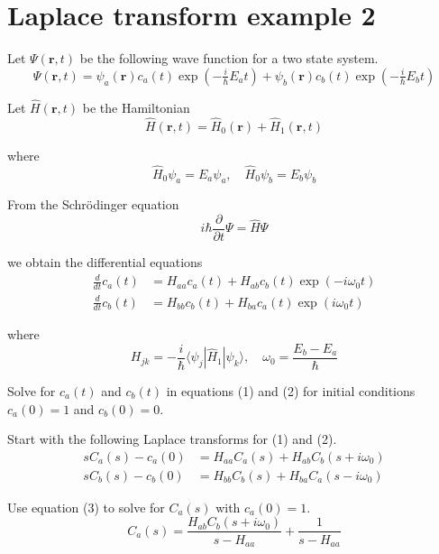 

\section*{Laplace transform example 2}

Let $\Psi(\mathbf r,t)$ be the following wave function for a two state system.
\begin{equation*}
\Psi(\mathbf r,t)=\psi_a(\mathbf r)c_a(t)\exp(-\tfrac{i}{\hbar}E_at)+
\psi_b(\mathbf r)c_b(t)\exp(-\tfrac{i}{\hbar}E_bt)
\end{equation*}

Let $\hat H(\mathbf r,t)$ be the Hamiltonian
\begin{equation*}
\hat H(\mathbf r,t)=\hat H_0(\mathbf r)+\hat H_1(\mathbf r,t)
\end{equation*}

where
\begin{equation*}
\hat H_0\psi_a=E_a\psi_a,\quad\hat H_0\psi_b=E_b\psi_b
\end{equation*}

From the Schr\"odinger equation
\begin{equation*}
i\hbar\frac{\partial}{\partial t}\Psi=\hat H\Psi
\end{equation*}

we obtain the differential equations
\begin{align*}
\frac{d}{dt}c_a(t)&=H_{aa}c_a(t)+H_{ab}c_b(t)\exp(-i\omega_0t)
\tag{1}
\\[1ex]
\frac{d}{dt}c_b(t)&=H_{bb}c_b(t)+H_{ba}c_a(t)\exp(i\omega_0t)
\tag{2}
\end{align*}

where
\begin{equation*}
H_{jk}=-\frac{i}{\hbar}\langle\psi_j|\hat H_1|\psi_k\rangle,\quad
\omega_0=\frac{E_b-E_a}{\hbar}
\end{equation*}

Solve for $c_a(t)$ and $c_b(t)$ in equations (1) and (2) for
initial conditions $c_a(0)=1$ and $c_b(0)=0$.

\bigskip
Start with the following Laplace transforms for (1) and (2).
\begin{align*}
sC_a(s)-c_a(0)&=H_{aa}C_a(s)+H_{ab}C_b(s+i\omega_0)
\tag{3}
\\[1ex]
sC_b(s)-c_b(0)&=H_{bb}C_b(s)+H_{ba}C_a(s-i\omega_0)
\tag{4}
\end{align*}

Use equation (3) to solve for $C_a(s)$ with $c_a(0)=1$.
\begin{equation*}
C_a(s)=\frac{H_{ab}C_b(s+i\omega_0)}{s-H_{aa}}+\frac{1}{s-H_{aa}}
\end{equation*}

